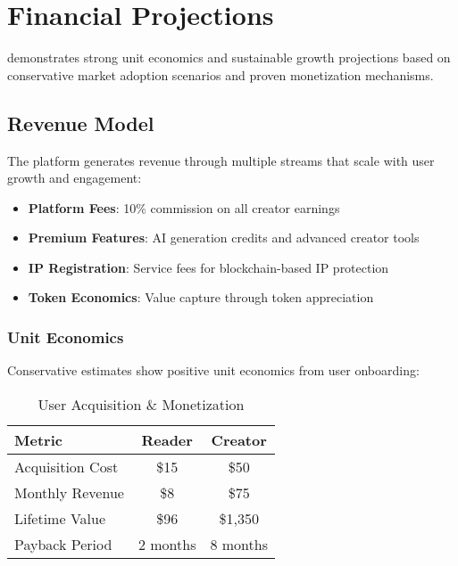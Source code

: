 \section{Financial Projections}
\label{sec:financial-projections}

\storyhouse{} demonstrates strong unit economics and sustainable growth projections based on conservative market adoption scenarios and proven monetization mechanisms.

\subsection{Revenue Model}

The platform generates revenue through multiple streams that scale with user growth and engagement:

\begin{itemize}
    \item \textbf{Platform Fees}: 10\% commission on all creator earnings
    \item \textbf{Premium Features}: AI generation credits and advanced creator tools
    \item \textbf{IP Registration}: Service fees for blockchain-based IP protection
    \item \textbf{Token Economics}: Value capture through \tip{} token appreciation
\end{itemize}

\subsubsection{Unit Economics}

Conservative estimates show positive unit economics from user onboarding:

\begin{table}[H]
\centering
\caption{User Acquisition \& Monetization}
\label{tab:unit-economics}
\begin{tabular}{@{}lcc@{}}
\toprule
\textbf{Metric} & \textbf{Reader} & \textbf{Creator} \\
\midrule
Acquisition Cost & \$15 & \$50 \\
Monthly Revenue & \$8 & \$75 \\
Lifetime Value & \$96 & \$1,350 \\
Payback Period & 2 months & 8 months \\
\bottomrule
\end{tabular}
\end{table}

